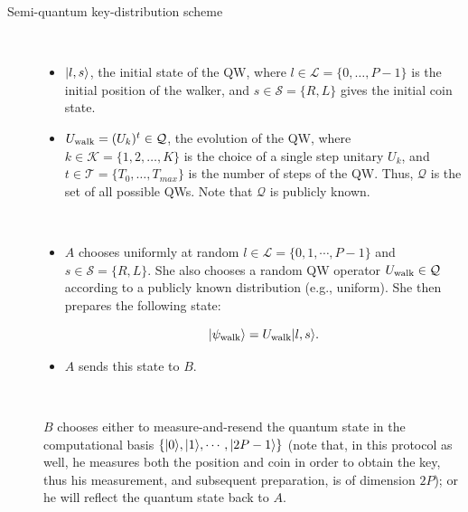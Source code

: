 \newpage
\begin{protocol} Semi-quantum key-distribution scheme\
\label{prot:semi-q} 
\begin{description}
\item[\hspace{6mm}{\bf Inputs for the protocol} ]\
\begin{itemize}
	\item $| l,s \rangle$, the initial state of the QW, where $l \in \mathcal L=\{ 0, \dots, P-1 \} $ is the initial position of the walker, and $s \in \mathcal S=\{R,L\}$ gives the initial coin state.
	\item $U_{\textnormal{walk}} = (U_k)^t \in \mathcal Q$, the evolution of the QW, where $k \in \mathcal K  =\{1,2,\ldots,K\}$ is the choice of a single step unitary $U_k$, and $t \in \mathcal{T} = \{ T_0, \dots, T_{max} \}$ is the number of steps of the QW. Thus, $\mathcal Q$ is the set of all possible QWs. Note that $\mathcal Q$  is publicly known.
\end{itemize}

\vspace{3mm}
\item[\hspace{6mm}{\bf Quantum state Generation}]\
\begin{itemize}
 \item $A$ chooses uniformly at random $l \in \mathcal L=\{0,1,\cdots, P-1\}$ and $s\in\mathcal S=\{R,L\}$.  She also chooses a random QW operator $U_{\textnormal{walk}} \in \mathcal{Q}$ according to a publicly known distribution (e.g., uniform).  She then prepares the following state:

$$| \psi_{\textnormal{walk}} \rangle = U_{\textnormal{walk}}| l,s \rangle.$$
\item $A$ sends this state to $B$.
\end{itemize}

\vspace{3mm}
 \item[\hspace{6mm}{ \bf Classical operations by $B$} ]\
 
 
  $B$ chooses either to measure-and-resend the quantum state in the computational basis $\{| 0 \rangle, | 1 \rangle, \cdots, | 2P-1 \rangle\}$ (note that, in this protocol as well, he measures both the position and coin in order to obtain the key, thus his measurement, and subsequent preparation, is of dimension $2P$); or he will reflect the quantum state back to $A$.

\vspace{3mm}


\end{description}
\end{protocol}
